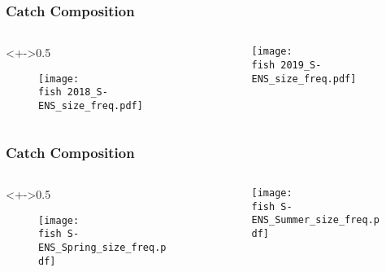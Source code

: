 \documentclass{beamer}
\begin{document}
	
	\begin{frame}
		\frametitle{Catch Composition}
		
		\begin{columns}
			\begin{column}<+->{0.5\textwidth}
				\vspace*{-0.5cm}
				\begin{figure}
					\centerline{\texttt{[image: \\fish 2018\_S-ENS\_size\_freq.pdf]}}
					
				\end{figure}
			\end{column}
			
			\begin{column}{0.5\textwidth}
				\begin{figure}
					\vspace*{-0.5cm}
					
					\centerline{\texttt{[image: \\fish 2019\_S-ENS\_size\_freq.pdf]}}
					
				\end{figure}
				
			\end{column}
		\end{columns}
		
		
	\end{frame}
	
	
	
	
	
	\begin{frame}
		\frametitle{Catch Composition}
		
		\begin{columns}
			\begin{column}<+->{0.5\textwidth}
				\vspace*{-0.5cm}
				\begin{figure}
					\centerline{\texttt{[image: \\fish S-ENS\_Spring\_size\_freq.pdf]}}
					
				\end{figure}
			\end{column}
			
			\begin{column}{0.5\textwidth}
				
				\vspace*{-0.5cm}
				\begin{figure}
					
					\centerline{\texttt{[image: \\fish S-ENS\_Summer\_size\_freq.pdf]}}
					
				\end{figure}
				
			\end{column}
		\end{columns}
		
		
	\end{frame}
	
\end{document}
